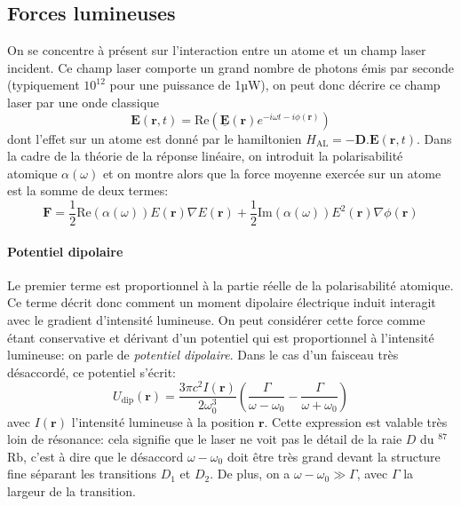 \subsection{Forces lumineuses}
On se concentre à présent sur l'interaction entre un atome et un champ laser incident. Ce champ laser comporte un grand nombre de photons émis par seconde (typiquement $10^{12}$ pour une puissance de 1µW), on peut donc décrire ce champ laser par une onde classique 
\begin{equation}
\mathbf{E}(\mathbf{r},t)= \mathrm{Re} \left( \underline{\mathbf{E}}(\mathbf{r}) e^{-i \omega t - i\phi (\mathbf{r})} \right)
\end{equation}
dont l'effet sur un atome est donné par le hamiltonien $H_{\mathrm{AL}}=-\mathbf{D}.\mathbf{E}(\mathbf{r},t)$. 
Dans la cadre de la théorie de la réponse linéaire, on introduit la polarisabilité atomique $\alpha(\omega)$ et on montre alors que la force moyenne exercée sur un atome est la somme de deux termes:
\begin{equation}
\mathbf{F}=\frac{1}{2} \mathrm{Re}(\alpha(\omega)) E(\mathbf{r}) \nabla E(\mathbf{r})+\frac{1}{2}\mathrm{Im}(\alpha(\omega)) E^2(\mathbf{r}) \nabla \phi(\mathbf{r})
\end{equation}

\paragraph*{Potentiel dipolaire}
Le premier terme est proportionnel à la partie réelle de la polarisabilité atomique. Ce terme décrit donc comment un moment dipolaire électrique induit interagit avec le gradient d'intensité lumineuse. On peut considérer cette force comme étant conservative et dérivant d'un potentiel qui est proportionnel à l'intensité lumineuse: on parle de \emph{potentiel dipolaire}. Dans le cas d'un faisceau très désaccordé, ce potentiel s'écrit:
\begin{equation}
U_{\mathrm{dip}}(\mathbf{r})=\frac{3\pi c^2 I(\mathbf{r})}{2 \omega_0^3} \left( \frac{\Gamma}{\omega - \omega_0} - \frac{\Gamma}{\omega + \omega_0} \right)
\end{equation}
avec $I(\mathbf{r})$ l'intensité lumineuse à la position $\mathbf{r}$. Cette expression est valable très loin de résonance: cela signifie que le laser ne voit pas le détail de la raie $D$ du ${}^{87}$Rb, c'est à dire que le désaccord $\omega-\omega_0$ doit être très grand devant la structure fine séparant les transitions $D_1$ et $D_2$. De plus, on a $\omega-\omega_0 \gg \Gamma$, avec $\Gamma$ la largeur de la transition.

